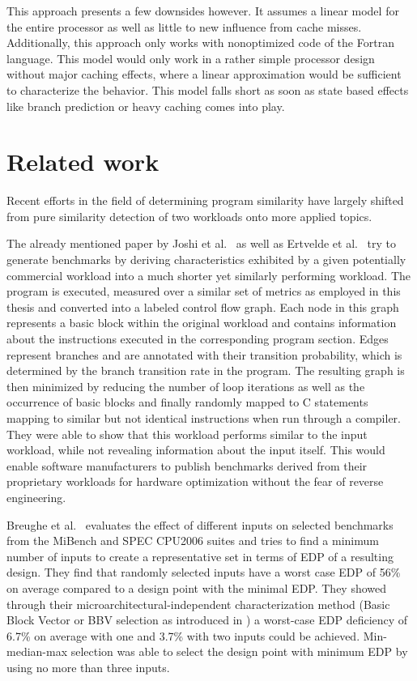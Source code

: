 \documentclass[../bachelor_paper.tex]{subfiles}
\begin{document}
This approach presents a few downsides however. It assumes a linear model for the entire processor as well as little to new influence from cache misses. Additionally, this approach only works with nonoptimized code of the Fortran language. This model would only work in a rather simple processor design without major caching effects, where a linear approximation would be sufficient to characterize the behavior. This model falls short as soon as state based effects like branch prediction or heavy caching comes into play.

\section{Related work}
	\label{sec:prob/rel}

Recent efforts in the field of determining program similarity have largely shifted from pure similarity detection of two workloads onto more applied topics. 

The already mentioned paper by Joshi et al.\ \cite{joshiDistillingEssenceProprietary2008} as well as Ertvelde et al.\ \cite{vanertveldeBenchmarkSynthesisArchitecture2010} try to generate benchmarks by deriving characteristics exhibited by a given potentially commercial workload into a much shorter yet similarly performing workload. The program is executed, measured over a similar set of metrics as employed in this thesis and converted into a labeled control flow graph. Each node in this graph represents a basic block within the original workload and contains information about the instructions executed in the corresponding program section. Edges represent branches and are annotated with their transition probability, which is determined by the branch transition rate in the program. The resulting graph is then minimized by reducing the number of loop iterations as well as the occurrence of basic blocks and finally randomly mapped to C statements mapping to similar but not identical instructions when run through a compiler. They were able to show that this workload performs similar to the input workload, while not revealing information about the input itself. This would enable software manufacturers to publish benchmarks derived from their proprietary workloads for hardware optimization without the fear of reverse engineering.

Breughe et al.\ \cite{breugheSelectingRepresentativeBenchmark2013} evaluates the effect of different inputs on selected benchmarks from the MiBench and SPEC CPU2006 suites and tries to find a minimum number of inputs to create a representative set in terms of \ac{EDP} of a resulting design. They find that randomly selected inputs have a worst case \ac{EDP} of 56\% on average compared to a design point with the minimal \ac{EDP}. They showed through their microarchitectural-independent characterization method (Basic Block Vector or BBV selection as introduced in \cite{sherwoodBasicBlockDistribution2001}) a worst-case \ac{EDP} deficiency of 6.7\% on average with one and 3.7\% with two inputs could be achieved. Min-median-max selection was able to select the design point with minimum \ac{EDP} by using no more than three inputs.
\end{document}
